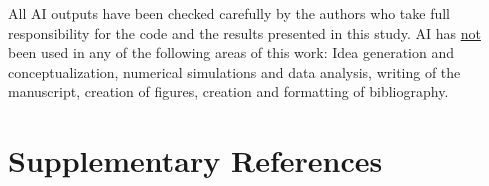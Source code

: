\documentclass{article}
\theoremstyle{definition}
\begin{document}
\begin{refsection}
All AI outputs have been checked carefully by the authors who take full responsibility for the code and the results presented in this study. AI has \underline{not} been used in any of the following areas of this work: Idea generation and conceptualization, numerical simulations and data analysis, writing of the manuscript, creation of figures, creation and formatting of bibliography.


% 
% 



\section{Supplementary References}
\printbibliography[heading=none]
\end{refsection}
\end{document}
